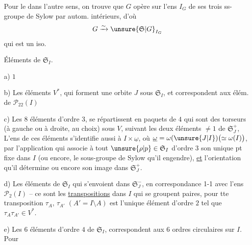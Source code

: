 Pour le  dans l'autre sens, on trouve que $G$ opère sur l'ens $I_G$ de ses trois ss-groupe de Sylow par autom. intérieurs, d'où
\[
G\xrightarrow{\sim}\unsure{\mathfrak{S}|G}_{I_G}
\]
qui est un iso.

Éléments de $\mathfrak{S}_I$.

a) $1$

b) Les  éléments   $V^{*}$, qui forment une orbite $J$ sous $\mathfrak{S}_I$, et correspondent aux élém. de $\mathcal{P}_{22}(I)$

c) Les  $8$ éléments d'ordre $3$, se répartissent en    paquets de $4$ qui sont des torseurs (à gauche ou à droite, au choix) sous $V$, suivant les deux éléments $\ne1$ de $\mathfrak{S}_J^+$, L'ens de ces éléments s'identifie aussi à $I\times\underline{\omega}$, où $\underline{\omega}=\omega(\unsure{J|I})\bigl(\simeq\omega(I)\bigr)$, par l'application qui associe à tout $\unsure{\rho|p}\in\mathfrak{S}_I$ d'ordre $3$ son unique pt fixe dans $I$ (ou encore, le sous-groupe de Sylow qu'il engendre), \uline{et} l'orientation qu'il détermine  ou encore son image dans $\mathfrak{S}_J^+$.

d) Les   éléments   de $\mathfrak{S}_I$ qui s'envoient dans $\mathfrak{S}_J^-$, en correspondance 1-1 avec l'ens $\mathcal{P}_2(I)$ -- ce sont les \uline{transpositions} dans $I$ qui se groupent    paires, pour tte transposition $\tau_A$, $\tau_{A'}$ \deleted{$\unsure{\tau}$} $(A'=I\setminus A)$ est l'unique  élément d'ordre $2$ tel que $\tau_A\tau_{A'}\in V^*$.

e) Les $6$ éléments d'ordre $4$ de $\mathfrak{S}_I$, correspondent aux $6$ ordres circulaires sur $I$. Pour
